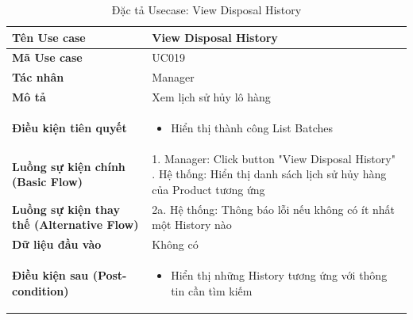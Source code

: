 \documentclass[12pt,a4paper]{report}
\begin{document}
\begin{longtable}{|>{\raggedright\arraybackslash\bfseries}p{4.5cm}|p{11cm}|}
\caption{Đặc tả Usecase: View Disposal History} \label{tab:uc_view_disposal_history} \\
\hline
Tên Use case & View Disposal History \\ \hline
Mã Use case & UC019 \\ \hline
Tác nhân & Manager \\ \hline
Mô tả & Xem lịch sử hủy lô hàng \\ \hline
Điều kiện tiên quyết & 
\begin{itemize}[leftmargin=*, nosep, topsep=0pt, partopsep=0pt]
    \item Hiển thị thành công List Batches
\end{itemize} \\ \hline
Luồng sự kiện chính (Basic Flow) & 
1. Manager: Click button "View Disposal History" \newline
2. Hệ thống: Hiển thị danh sách lịch sử hủy hàng của Product tương ứng \\ \hline
Luồng sự kiện thay thế (Alternative Flow) & 
2a. Hệ thống: Thông báo lỗi nếu không có ít nhất một History nào \\ \hline
Dữ liệu đầu vào & Không có \\ \hline
Điều kiện sau (Post-condition) & 
\begin{itemize}[leftmargin=*, nosep, topsep=0pt, partopsep=0pt]
    \item Hiển thị những History tương ứng với thông tin cần tìm kiếm
\end{itemize} \\ \hline
\end{longtable}

\vspace{0.5cm}
\end{document}
